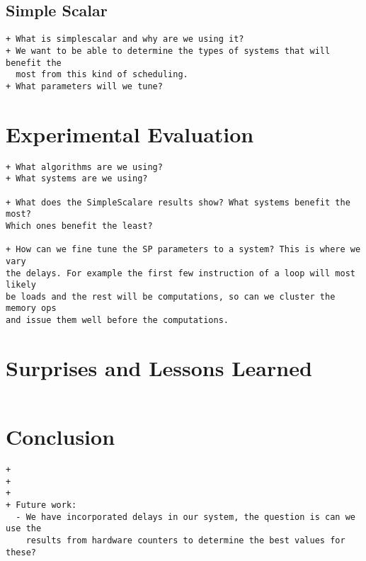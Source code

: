 \documentclass[10pt]{article}
\begin{document}
\subsection{Simple Scalar}

\begin{verbatim}
+ What is simplescalar and why are we using it?
+ We want to be able to determine the types of systems that will benefit the
  most from this kind of scheduling.
+ What parameters will we tune?
\end{verbatim}

\section{Experimental Evaluation}

\begin{verbatim}
+ What algorithms are we using?
+ What systems are we using?

+ What does the SimpleScalare results show? What systems benefit the most?
Which ones benefit the least?

+ How can we fine tune the SP parameters to a system? This is where we vary
the delays. For example the first few instruction of a loop will most likely
be loads and the rest will be computations, so can we cluster the memory ops
and issue them well before the computations.

\end{verbatim}

\section{Surprises and Lessons Learned}
\begin{verbatim}
\end{verbatim}

\section{Conclusion}
\begin{verbatim}
+
+
+
+ Future work:
  - We have incorporated delays in our system, the question is can we use the
    results from hardware counters to determine the best values for these?
\end{verbatim}




\end{document}
